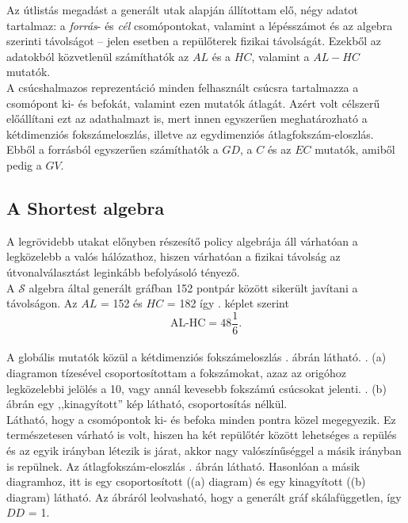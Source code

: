   Az útlistás megadást a generált utak alapján állítottam elő, négy adatot tartalmaz: a \textit{forrás}- és \textit{cél} csomópontokat, valamint a lépésszámot és az algebra szerinti távolságot -- jelen esetben a repülőterek fizikai távolságát. Ezekből az adatokból közvetlenül számíthatók az $AL$ és a $HC$, valamint a $AL-HC$ mutatók.\\

  A csúcshalmazos reprezentáció minden felhasznált csúcsra tartalmazza a csomópont ki- és befokát, valamint ezen mutatók átlagát. Azért volt célszerű előállítani ezt az adathalmazt is, mert innen egyszerűen meghatározható a kétdimenziós fokszámeloszlás, illetve az egydimenziós átlagfokszám-eloszlás. Ebből a forrásból egyszerűen számíthatók a $GD$, a $C$ és az $EC$ mutatók, amiből pedig a $GV$.

    \subsection{A Shortest algebra}
    A legrövidebb utakat előnyben részesítő policy algebrája áll várhatóan a legközelebb a valós hálózathoz, hiszen várhatóan a fizikai távolság az útvonalválasztást leginkább befolyásoló tényező.\\

    A $\mathcal{S}$ algebra által generált gráfban 152 pontpár között sikerült javítani a távolságon. Az $AL$ = 152 és $HC$ = 182 így . képlet szerint $$\text{AL-HC} = 48 \frac{1}{6}.$$\\

    A globális mutatók közül a kétdimenziós fokszámeloszlás . ábrán látható. . (a) diagramon tízesével csoportosítottam a fokszámokat, azaz az origóhoz legközelebbi jelölés a 10, vagy annál kevesebb fokszámú csúcsokat jelenti. . (b) ábrán egy ,,kinagyított'' kép látható, csoportosítás nélkül.
    \\

    Látható, hogy a csomópontok ki- és befoka minden pontra közel megegyezik. Ez természetesen várható is volt, hiszen ha két repülőtér között lehetséges a repülés és az egyik irányban létezik is járat, akkor nagy valószínűséggel a másik irányban is repülnek. Az átlagfokszám-eloszlás . ábrán látható. Hasonlóan a másik diagramhoz, itt is egy csoportosított ((a) diagram) és egy kinagyított ((b) diagram) látható. Az ábráról leolvasható, hogy a generált gráf skálafüggetlen, így $DD$ = 1.

